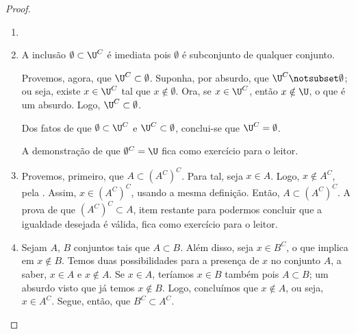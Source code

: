 \begin{proof}
\begin{enumerate}
\item[]
\item A inclusão $\emptyset \subset \U^C$ é imediata pois $\emptyset$ é subconjunto de qualquer conjunto. 

Provemos, agora, que $\U^C \subset \emptyset$. Suponha, por absurdo, que $\U^C \notsubset \emptyset$; ou seja, existe $x \in \U^C$ tal que $x \notin \emptyset$. Ora, se $x \in \U^C$, então $x \notin \U$, o que é um absurdo. Logo, $\U^C \subset \emptyset$.

Dos fatos de que $\emptyset \subset \U^C$ e $\U^C \subset \emptyset$, conclui-se que $\U^C = \emptyset$.

A demonstração de que $\emptyset^C = \U$ fica como exercício para o leitor.

\item Provemos, primeiro, que $A \subset (A^C)^C$. Para tal, seja $x \in A$. Logo, $x \notin A^C$, pela . Assim, $x \in (A^C)^C$, usando a mesma definição. Então, $A \subset (A^C)^C$. A prova de que $(A^C)^C \subset A$, item restante para podermos concluir que a igualdade desejada é válida, fica como exercício para o leitor.

\item Sejam $A$, $B$ conjuntos tais que $A \subset B$. Além disso, seja $x \in B^C$, o que implica em $x \notin B$. Temos duas possibilidades para a presença de $x$ no conjunto $A$, a saber, $x \in A$ e $x \notin A$. Se $x \in A$, teríamos $x \in B$ também pois $A \subset B$; um absurdo visto que já temos $x \notin B$. Logo, concluímos que $x \notin A$, ou seja, $x \in A^C$. Segue, então, que $B^C \subset A^C$.
\end{enumerate}
\end{proof}


